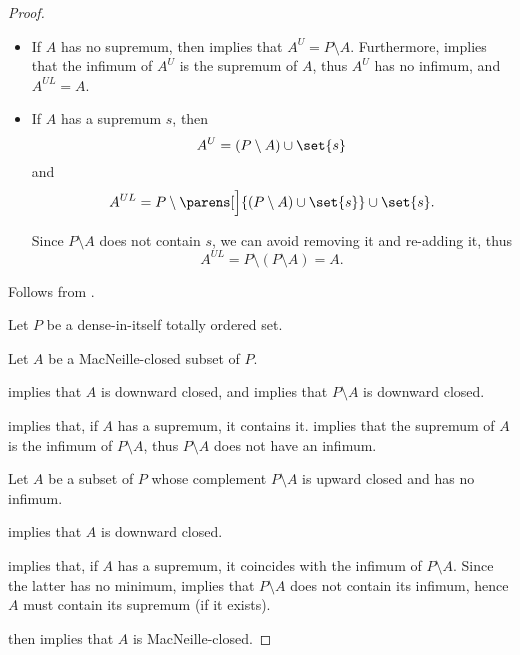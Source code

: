 \begin{proof}
  \begin{itemize}
    \item If \( A \) has no supremum, then  implies that \( A^U = P \setminus A \). Furthermore,  implies that the infimum of \( A^U \) is the supremum of \( A \), thus \( A^U \) has no infimum, and \( A^{UL} = A \).

    \item If \( A \) has a supremum \( s \), then
    \begin{equation*}
      A^U = (P \setminus A) \cup \set{ s }
    \end{equation*}
    and
    \begin{equation*}
      A^{UL}
      =
      P \setminus \parens[\Big]{ (P \setminus A) \cup \set{ s } } \cup \set{ s }.
    \end{equation*}

    Since \( P \setminus A \) does not contain \( s \), we can avoid removing it and re-adding it, thus
    \begin{equation*}
      A^{UL} = P \setminus (P \setminus A) = A.
    \end{equation*}
  \end{itemize}

  Follows from .

   Let \( P \) be a dense-in-itself totally ordered set.

  \SufficiencySubProof* Let \( A \) be a MacNeille-closed subset of \( P \).

   implies that \( A \) is downward closed, and  implies that \( P \setminus A \) is downward closed.

   implies that, if \( A \) has a supremum, it contains it.  implies that the supremum of \( A \) is the infimum of \( P \setminus A \), thus \( P \setminus A \) does not have an infimum.

  \NecessitySubProof* Let \( A \) be a subset of \( P \) whose complement \( P \setminus A \) is upward closed and has no infimum.

   implies that \( A \) is downward closed.

   implies that, if \( A \) has a supremum, it coincides with the infimum of \( P \setminus A \). Since the latter has no minimum,  implies that \( P \setminus A \) does not contain its infimum, hence \( A \) must contain its supremum (if it exists).

   then implies that \( A \) is MacNeille-closed.
\end{proof}

